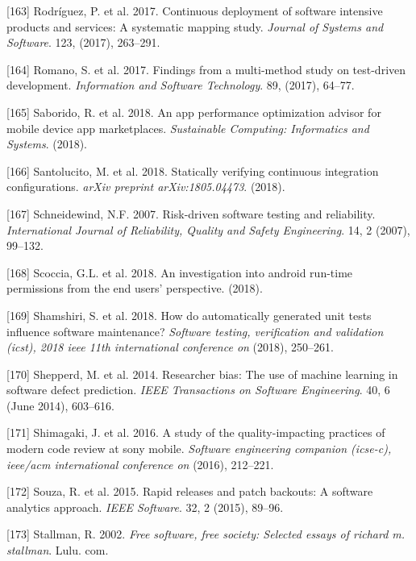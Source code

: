 \documentclass[]{book}
\begin{document}
\hypertarget{ref-rodriguez2017a}{}
{[}163{]} Rodríguez, P. et al. 2017. Continuous deployment of software
intensive products and services: A systematic mapping study.
\emph{Journal of Systems and Software}. 123, (2017), 263--291.

\hypertarget{ref-ROMANO201764}{}
{[}164{]} Romano, S. et al. 2017. Findings from a multi-method study on
test-driven development. \emph{Information and Software Technology}. 89,
(2017), 64--77.

\hypertarget{ref-SKHA2018}{}
{[}165{]} Saborido, R. et al. 2018. An app performance optimization
advisor for mobile device app marketplaces. \emph{Sustainable Computing:
Informatics and Systems}. (2018).

\hypertarget{ref-santolucito2018statically}{}
{[}166{]} Santolucito, M. et al. 2018. Statically verifying continuous
integration configurations. \emph{arXiv preprint arXiv:1805.04473}.
(2018).

\hypertarget{ref-schneidewind2007}{}
{[}167{]} Schneidewind, N.F. 2007. Risk-driven software testing and
reliability. \emph{International Journal of Reliability, Quality and
Safety Engineering}. 14, 2 (2007), 99--132.

\hypertarget{ref-scoccia2018investigation}{}
{[}168{]} Scoccia, G.L. et al. 2018. An investigation into android
run-time permissions from the end users' perspective. (2018).

\hypertarget{ref-shamshiri2018automatically}{}
{[}169{]} Shamshiri, S. et al. 2018. How do automatically generated unit
tests influence software maintenance? \emph{Software testing,
verification and validation (icst), 2018 ieee 11th international
conference on} (2018), 250--261.

\hypertarget{ref-Shepperd2014}{}
{[}170{]} Shepperd, M. et al. 2014. Researcher bias: The use of machine
learning in software defect prediction. \emph{IEEE Transactions on
Software Engineering}. 40, 6 (June 2014), 603--616.

\hypertarget{ref-shimagaki2016study}{}
{[}171{]} Shimagaki, J. et al. 2016. A study of the quality-impacting
practices of modern code review at sony mobile. \emph{Software
engineering companion (icse-c), ieee/acm international conference on}
(2016), 212--221.

\hypertarget{ref-souza2015a}{}
{[}172{]} Souza, R. et al. 2015. Rapid releases and patch backouts: A
software analytics approach. \emph{IEEE Software}. 32, 2 (2015), 89--96.

\hypertarget{ref-Stallman2002}{}
{[}173{]} Stallman, R. 2002. \emph{Free software, free society: Selected
essays of richard m. stallman}. Lulu. com.
\end{document}
